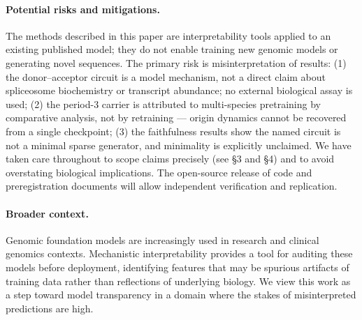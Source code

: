 \paragraph{Potential risks and mitigations.}
The methods described in this paper are interpretability tools applied to an existing published model; they do not enable training new genomic models or generating novel sequences. The primary risk is misinterpretation of results: (1) the donor--acceptor circuit is a model mechanism, not a direct claim about spliceosome biochemistry or transcript abundance; no external biological assay is used; (2) the period-3 carrier is attributed to multi-species pretraining by comparative analysis, not by retraining — origin dynamics cannot be recovered from a single checkpoint; (3) the faithfulness results show the named circuit is not a minimal sparse generator, and minimality is explicitly unclaimed. We have taken care throughout to scope claims precisely (see §3 and §4) and to avoid overstating biological implications. The open-source release of code and preregistration documents will allow independent verification and replication.

\paragraph{Broader context.}
Genomic foundation models are increasingly used in research and clinical genomics contexts. Mechanistic interpretability provides a tool for auditing these models before deployment, identifying features that may be spurious artifacts of training data rather than reflections of underlying biology. We view this work as a step toward model transparency in a domain where the stakes of misinterpreted predictions are high.
